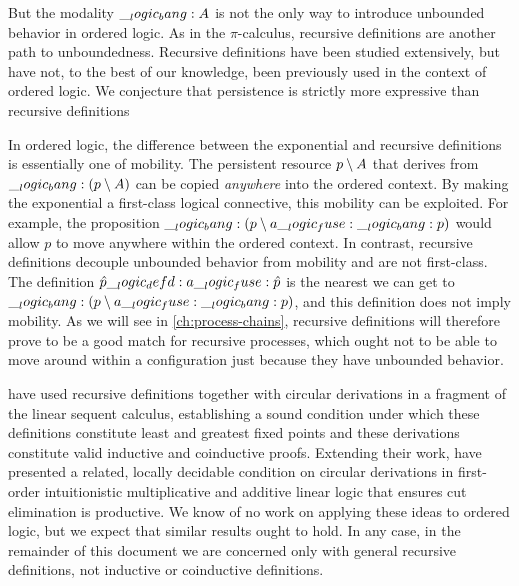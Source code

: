 But the modality $\__logic_bang: A$ is not the only way to introduce unbounded behavior in ordered logic.
As in the $\pi$-calculus\autocites{Milner+:IC92a}{Milner+:IC92b}, recursive definitions are another path to unboundedness.
Recursive definitions have been studied extensively\autocites{Hallnas:TCS91}{Eriksson:ELP91}{Schroeder-Heister:LICS93}{McDowell+Miller:TCS00}{Tiu+Momigliano:JAL12}, but have not, to the best of our knowledge, been previously used in the context of ordered logic.
We conjecture that persistence is strictly more expressive than recursive definitions

In ordered logic, the difference between the exponential and recursive definitions is essentially one of mobility.
The persistent resource $p \mathbin { \setminus } A$ that derives from $\__logic_bang: (p \mathbin { \setminus } A)$ can be copied \emph{anywhere} into the ordered context.
By making the exponential a first-class logical connective, this mobility can be exploited.
For example, the proposition $\__logic_bang: (p \mathbin { \setminus } a \__logic_fuse: \__logic_bang: p)$ would allow $p$ to move anywhere within the ordered context.
In contrast, recursive definitions decouple unbounded behavior from mobility and are not first-class.
The definition $\hat{p} \__logic_defd: a \__logic_fuse: \hat{p}$ is the nearest we can get to $\__logic_bang: (p \mathbin { \setminus } a \__logic_fuse: \__logic_bang: p)$, and this definition does not imply mobility.
As we will see in \cref{ch:process-chains}, recursive definitions will therefore prove to be a good match for recursive processes, which ought not to be able to move around within a configuration just because they have unbounded behavior.


 have used recursive definitions together with circular derivations in a fragment of the linear sequent calculus, establishing a sound condition under which these definitions constitute least and greatest fixed points and these derivations constitute valid inductive and coinductive proofs.
Extending their work,  have presented a related, locally decidable condition on circular derivations in first-order intuitionistic multiplicative and additive linear logic that ensures cut elimination is productive.
We know of no work on applying these ideas to ordered logic, but we expect that similar results ought to hold.
In any case, in the remainder of this document we are concerned only with general recursive definitions, not inductive or coinductive definitions.

